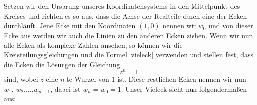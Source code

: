 \documentclass[a4paper,12pt]{article} %
\begin{document}
Setzen wir den Ursprung unseres Koordinatensystems in den Mittelpunkt des Kreises und richten es so aus, dass die Achse der Realteile durch eine der Ecken durchläuft.
Jene Ecke mit den Koordinaten $(1,0)$ nennen wir $w_0$ und von dieser Ecke aus werden wir auch die Linien zu den anderen Ecken ziehen.
Wenn wir nun alle Ecken als komplexe Zahlen ansehen, so können wir die Kreisteilungsgleichungen und die Formel \eqref{vieleck} verwenden und stellen fest, dass die Ecken die Lösungen der Gleichung
\begin{equation}
	z^n=1
\end{equation}
sind, wobei $z$ eine $n$-te Wurzel von $1$ ist.
Diese restlichen Ecken nennen wir nun $w_1$, $w_2$,$\dots$,$w_{n-1}$, dabei ist $w_n = w_0 = 1$.
Unser Vieleck sieht nun folgendermaßen aus:

\begin{figure}
	\begin{center}
		

\end{center}
\end{figure}
\end{document}
